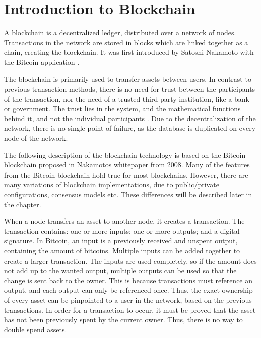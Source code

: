 \section{Introduction to Blockchain} \label{blockchain_basics}
A blockchain is a decentralized ledger, distributed over a network of nodes. Transactions in the network are stored in blocks which are linked together as a chain, creating the blockchain. It was first introduced by Satoshi Nakamoto with the Bitcoin application \cite{Nakamoto_bitcoin}.

The blockchain is primarily used to transfer assets between users. In contrast to previous transaction methods, there is no need for trust between the participants of the transaction, nor the need of a trusted third-party institution, like a bank or government. The trust lies in the system, and the mathematical functions behind it, and not the individual participants \cite{Nofer}. Due to the decentralization of the network, there is no single-point-of-failure, as the database is duplicated on every node of the network.

The following description of the blockchain technology is based on the Bitcoin blockchain proposed in Nakamotos whitepaper from 2008\cite{Nakamoto_bitcoin}. Many of the features from the Bitcoin blockchain hold true for most blockchains. However, there are many variations of blockchain implementations, due to public/private configurations, consensus models etc. These differences will be described later in the chapter.

When a node transfers an asset to another node, it creates a transaction. The transaction contains: one or more inputs; one or more outputs; and a digital signature. In Bitcoin, an input is a previously received and unspent output, containing the amount of bitcoins. Multiple inputs can be added together to create a larger transaction. The inputs are used completely, so if the amount does not add up to the wanted output, multiple outputs can be used so that the change is sent back to the owner. This is because transactions must reference an output, and each output can only be referenced once. Thus, the exact ownership of every asset can be pinpointed to a user in the network, based on the previous transactions. In order for a transaction to occur, it must be proved that the asset has not been previously spent by the current owner. Thus, there is no way to double spend assets. %

